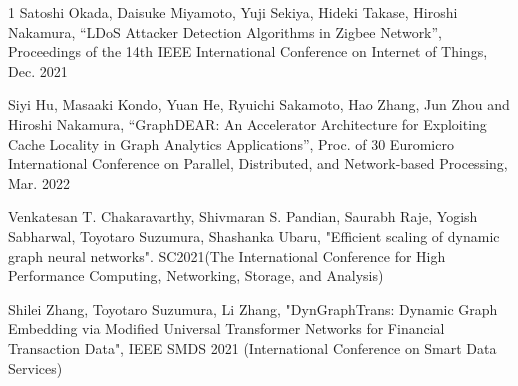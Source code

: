 \begin{査読付}{1}
Satoshi Okada, Daisuke Miyamoto, Yuji Sekiya, Hideki Takase, Hiroshi
Nakamura, ``LDoS Attacker Detection Algorithms in Zigbee Network'',
Proceedings of the 14th IEEE International Conference on Internet of
Things, Dec. 2021

Siyi Hu, Masaaki Kondo, Yuan He, Ryuichi Sakamoto, Hao Zhang, Jun Zhou
and Hiroshi Nakamura, ``GraphDEAR: An Accelerator Architecture for
Exploiting Cache Locality in Graph Analytics Applications'', Proc. of 30
Euromicro International Conference on Parallel, Distributed, and
Network-based Processing, Mar. 2022


Venkatesan T. Chakaravarthy, Shivmaran S. Pandian, Saurabh Raje, Yogish Sabharwal, Toyotaro Suzumura, Shashanka Ubaru, 
"Efficient scaling of dynamic graph neural networks". SC2021(The International Conference for High Performance Computing, Networking, Storage, and Analysis)

Shilei Zhang, Toyotaro Suzumura, Li Zhang, "DynGraphTrans: Dynamic Graph Embedding via Modified Universal Transformer Networks for Financial Transaction Data", IEEE SMDS 2021 (International Conference on Smart Data Services) 
\end{査読付}


